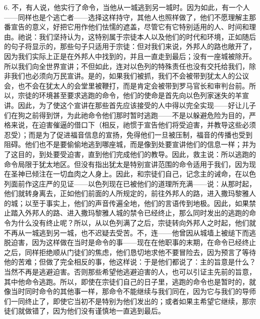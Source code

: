 6. 不，有人说，他实行了命令，当他从一城逃到另一城时。因为如此，有一个人——同样也是个逃亡者——选择这样持守，其他人也照样做了，他们不愿理解主那番宣告的意义，好把它用作他们怯懦的遮盖，尽管它有它特别适用的人、时间和理由。祂说：我们坚持认为，这特别属于宗徒本人以及他们的时代和环境，正如随后的句子将显示的，那些句子只适用于宗徒：但对我们来说，外邦人的路也敞开了，因为我们实际上正是在外邦人中找到的，并且一直走到最后；没有一座城被除开。所以我们向全世界宣讲；不但如此，连对以色列的特殊责任也没有交托给我们，除非我们也必须向万民宣讲。是的，如果我们被抓，我们不会被带到犹太人的公议会，也不会在犹太人的会堂里被鞭打，而是肯定会被带到罗马官长和审判台前。所以，宗徒的环境甚至要求逃跑的命令，他们的使命是首先向以色列家迷失的羊宣讲。因此，为了使这个宣讲在那些首先应该接受的人中得以完全实现——好让儿子们在狗之前得到饼，为此祂命令他们那时暂时逃跑——不是以躲避危险为目的，严格来说，在迫害催逼的借口下（相反，祂惯于宣告他们将受迫害，并教导这些必须忍受）；而是为了促进福音信息的宣扬，免得他们一旦被压制，福音的传播也受到阻碍。他们也不是要偷偷地逃到哪座城，而是像到处要宣讲他们的信息一样；并为了这目的，到处要受迫害，直到他们完成他们的教导。因此，救主说：所以逃跑的命令局限于犹太地区。但没有指出犹太是特别宣讲范围的命令适用于我们，因为现在圣神已倾注在一切血肉之人身上。因此，和宗徒们自己，记念主的诫命，在以色列面前作这庄严的见证——以色列现在已被他们的道理所充满——说：从那时起，他们就转身离去，正如他们前面的人所规定的，前往外邦人的路，进入撒玛黎雅人的城；以至于事实上，他们的声音传遍全地，他们的言语传到地极。因此，如果禁止踏入外邦人的路、进入撒玛黎雅人城的禁令已经终止，那么同时发出的逃跑的命令为什么没有终止呢？所以，从以色列满了之后，宗徒转向外邦人之时起，他们就不再从一城逃到另一城，也不迟疑去受苦。不，连——他曾因从城墙上被缒下而逃脱迫害，因为这样做在当时是命令的事——现在在他职事的末期，在命令已经终止之后，同样拒绝顺从门徒们的焦虑，他们恳切地求他不要冒险去，因为预言了等待他的苦难；但做了完全相反的事，他这样说：于是他们都说了：主的旨意是什么？当然不再是逃避迫害。否则那些希望他逃避迫害的人，也可以引证主先前的旨意，其中他命令逃跑。所以，即使在宗徒们自己的日子里，逃跑的命令也是暂时的，就像当时同时命令的其他事一样，那命令不能继续与我们同在，因为它与我们的导师们一同终止了，即使它当初不是特别为他们发出的；或者如果主希望它继续，那宗徒们就做错了，因为他们没有谨慎地一直逃到最后。\par

